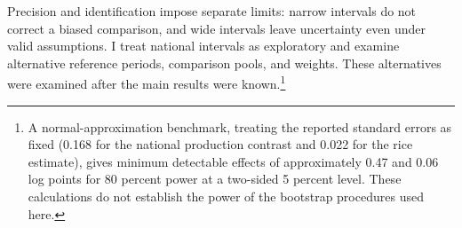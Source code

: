 Precision and identification impose separate limits: narrow intervals do not correct a biased comparison, and wide intervals leave uncertainty even under valid assumptions. I treat national intervals as exploratory and examine alternative reference periods, comparison pools, and weights. These alternatives were examined after the main results were known.\footnote{A normal-approximation benchmark, treating the reported standard errors as fixed (0.168 for the national production contrast and 0.022 for the rice estimate), gives minimum detectable effects of approximately 0.47 and 0.06 log points for 80 percent power at a two-sided 5 percent level. These calculations do not establish the power of the bootstrap procedures used here.}
